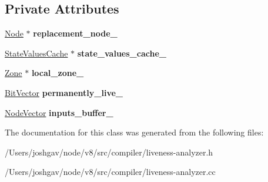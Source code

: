 \subsection*{Private Attributes}
\begin{DoxyCompactItemize}
\item 
\hyperlink{classv8_1_1internal_1_1compiler_1_1_node}{Node} $\ast$ {\bfseries replacement\+\_\+node\+\_\+}\hypertarget{classv8_1_1internal_1_1compiler_1_1_non_live_frame_state_slot_replacer_af10b2fd7097ad1aba5311665dd0acd58}{}\label{classv8_1_1internal_1_1compiler_1_1_non_live_frame_state_slot_replacer_af10b2fd7097ad1aba5311665dd0acd58}

\item 
\hyperlink{classv8_1_1internal_1_1compiler_1_1_state_values_cache}{State\+Values\+Cache} $\ast$ {\bfseries state\+\_\+values\+\_\+cache\+\_\+}\hypertarget{classv8_1_1internal_1_1compiler_1_1_non_live_frame_state_slot_replacer_ac90ab9c5a57093ce94ff29106c962ca3}{}\label{classv8_1_1internal_1_1compiler_1_1_non_live_frame_state_slot_replacer_ac90ab9c5a57093ce94ff29106c962ca3}

\item 
\hyperlink{classv8_1_1internal_1_1_zone}{Zone} $\ast$ {\bfseries local\+\_\+zone\+\_\+}\hypertarget{classv8_1_1internal_1_1compiler_1_1_non_live_frame_state_slot_replacer_a70d93a64a8cda2c77b68de7929203f76}{}\label{classv8_1_1internal_1_1compiler_1_1_non_live_frame_state_slot_replacer_a70d93a64a8cda2c77b68de7929203f76}

\item 
\hyperlink{classv8_1_1internal_1_1_bit_vector}{Bit\+Vector} {\bfseries permanently\+\_\+live\+\_\+}\hypertarget{classv8_1_1internal_1_1compiler_1_1_non_live_frame_state_slot_replacer_a87167894972b9c6cfa182b0cb59ffd89}{}\label{classv8_1_1internal_1_1compiler_1_1_non_live_frame_state_slot_replacer_a87167894972b9c6cfa182b0cb59ffd89}

\item 
\hyperlink{classv8_1_1internal_1_1_zone_vector}{Node\+Vector} {\bfseries inputs\+\_\+buffer\+\_\+}\hypertarget{classv8_1_1internal_1_1compiler_1_1_non_live_frame_state_slot_replacer_a6c11a430f454fb98c209b1d1897a14bd}{}\label{classv8_1_1internal_1_1compiler_1_1_non_live_frame_state_slot_replacer_a6c11a430f454fb98c209b1d1897a14bd}

\end{DoxyCompactItemize}


The documentation for this class was generated from the following files\+:\begin{DoxyCompactItemize}
\item 
/\+Users/joshgav/node/v8/src/compiler/liveness-\/analyzer.\+h\item 
/\+Users/joshgav/node/v8/src/compiler/liveness-\/analyzer.\+cc\end{DoxyCompactItemize}
